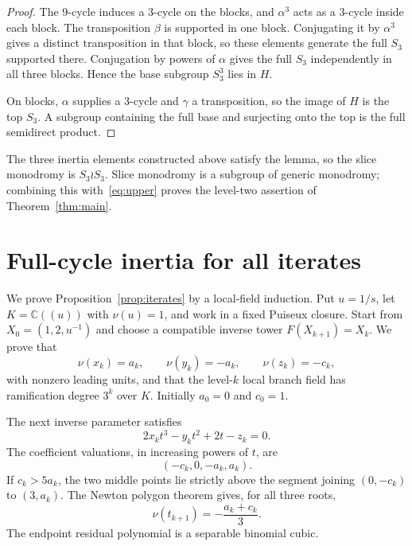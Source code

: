 \documentclass[11pt]{article}
\newcommand{\C}{\mathbb C}
\begin{document}
\begin{proof}
The 9-cycle induces a 3-cycle on the blocks, and $\alpha^3$ acts as a 3-cycle
inside each block. The transposition $\beta$ is supported in one block.
Conjugating it by $\alpha^3$ gives a distinct transposition in that block, so
these elements generate the full $S_3$ supported there. Conjugation by powers
of $\alpha$ gives the full $S_3$ independently in all three blocks. Hence the
base subgroup $S_3^3$ lies in $H$.

On blocks, $\alpha$ supplies a 3-cycle and $\gamma$ a transposition, so the
image of $H$ is the top $S_3$. A subgroup containing the full base and
surjecting onto the top is the full semidirect product.
\end{proof}

The three inertia elements constructed above satisfy the lemma, so the slice
monodromy is $S_3\wr S_3$. Slice monodromy is a subgroup of generic monodromy;
combining this with~\eqref{eq:upper} proves the level-two assertion of
Theorem~\ref{thm:main}.

\section{Full-cycle inertia for all iterates}

We prove Proposition~\ref{prop:iterates} by a local-field induction.  Put
$u=1/s$, let $K=\C((u))$ with $\nu(u)=1$, and work in a fixed Puiseux closure.
Start from $X_0=(1,2,u^{-1})$ and choose a compatible inverse tower
$F(X_{k+1})=X_k$.  We prove that
\begin{equation}
\nu(x_k)=a_k,\qquad \nu(y_k)=-a_k,\qquad \nu(z_k)=-c_k,
\label{eq:coordinate-valuations}
\end{equation}
with nonzero leading units, and that the level-$k$ local branch field has
ramification degree $3^k$ over $K$.  Initially $a_0=0$ and $c_0=1$.

The next inverse parameter satisfies
\[
2x_kt^3-y_kt^2+2t-z_k=0.
\]
The coefficient valuations, in increasing powers of $t$, are
\[
(-c_k,0,-a_k,a_k).
\]
If $c_k>5a_k$, the two middle points lie strictly above the segment joining
$(0,-c_k)$ to $(3,a_k)$.  The Newton polygon theorem gives, for all three
roots,
\begin{equation}
\nu(t_{k+1})=-\frac{a_k+c_k}{3}.
\label{eq:t-valuation}
\end{equation}
The endpoint residual polynomial is a separable binomial cubic.
\end{document}

